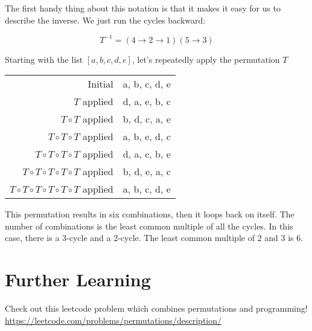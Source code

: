 The first handy thing about this notation is that it makes it easy for
us to describe the inverse. We just run the cycles backward:

$$T^{-1} = (4 \rightarrow 2 \rightarrow 1)(5 \rightarrow 3)$$

Starting with the list $[a, b, c, d, e]$, let's repeatedly apply the permutation $T$

\begin{tabular}{r | l}
  Initial & {\color{red} a, b,} {\color{blue} c,} {\color{red} d,} {\color{blue} e} \\ 
  $T$ applied & {\color{red} d, a,}  {\color{blue} e,} {\color{red} b,} {\color{blue} c}\\
  $T \circ T$ applied & {\color{red} b, d,} {\color{blue} c,} {\color{red} a,}  {\color{blue} e} \\
  $T \circ T \circ T$ applied & {\color{red} a, b,}  {\color{blue} e,} {\color{red} d,} {\color{blue} c} \\
  $T \circ T \circ T \circ T$ applied & {\color{red} d, a,} {\color{blue} c,} {\color{red}b,}  {\color{blue} e} \\
  $T \circ T \circ T \circ T \circ T$ applied & {\color{red} b, d,}  {\color{blue} e,} {\color{red} a,} {\color{blue} c} \\
  $T \circ T \circ T \circ T \circ T \circ T$ applied & {\color{red} a, b,} {\color{blue} c,} {\color{red} d,}  {\color{blue} e}\\
\end{tabular}

This permutation results in six combinations, then it loops back
on itself. The number of combinations is the least common multiple of
all the cycles.  In this case, there is a 3-cycle and a 2-cycle. The
least common multiple of 2 and 3 is 6.

\section{Further Learning}
Check out this leetcode problem which combines permutations and programming! 
\url{https://leetcode.com/problems/permutations/description/}
